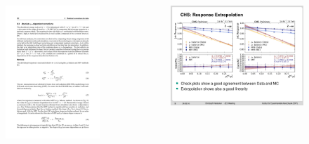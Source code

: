 {\begin{columns}[T]
		\vspace*{-0.4cm}
		\begin{figure}[T]
				\centering
				\includegraphics[width=3 cm]{images/l3equations.pdf}
				\label{fig:L3Residual}
		\end{figure}
		\vspace*{-0.3cm}                
		\begin{figure}[T]
				\centering
				\includegraphics[width=.75\textwidth]{images/l3res.pdf}
				\label{fig:L3Residual}
		\end{figure}

	\end{columns}
}
